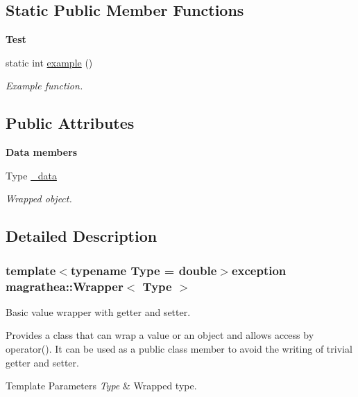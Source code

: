 \subsection*{Static Public Member Functions}
\begin{Indent}{\bf Test}\par
\begin{DoxyCompactItemize}
\item 
static int \hyperlink{exceptionmagrathea_1_1Wrapper_aadbba1e62e86b5b97b7962fcead3e24c}{example} ()
\begin{DoxyCompactList}\small\item\em Example function. \end{DoxyCompactList}\end{DoxyCompactItemize}
\end{Indent}
\subsection*{Public Attributes}
\begin{Indent}{\bf Data members}\par
\begin{DoxyCompactItemize}
\item 
Type \hyperlink{exceptionmagrathea_1_1Wrapper_a13694286c20475fdf38fb4625fd2327f}{\-\_\-data}
\begin{DoxyCompactList}\small\item\em Wrapped object. \end{DoxyCompactList}\end{DoxyCompactItemize}
\end{Indent}


\subsection{Detailed Description}
\subsubsection*{template$<$typename Type = double$>$exception magrathea\-::\-Wrapper$<$ Type $>$}

Basic value wrapper with getter and setter. 

Provides a class that can wrap a value or an object and allows access by {\ttfamily operator()}. It can be used as a public class member to avoid the writing of trivial getter and setter. 
\begin{DoxyTemplParams}{Template Parameters}
{\em Type} & Wrapped type. \\
\hline
\end{DoxyTemplParams}


